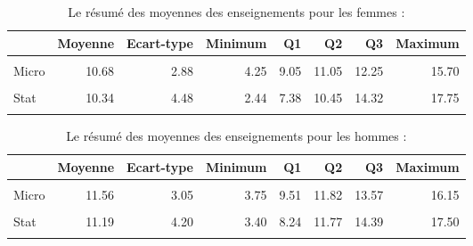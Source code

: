 \documentclass[
  11pt,
  french,
]{article}
\begin{document}
\begin{table}[!h]

\caption{\label{tab:table8 and table9}Le résumé des moyennes des enseignements pour les femmes :}
\centering
\begin{tabular}[t]{lrrrrrrr}
\toprule
  & Moyenne & Ecart-type & Minimum & Q1 & Q2 & Q3 & Maximum\\
\midrule
\cellcolor{gray!6}{Macro} & \cellcolor{gray!6}{11.57} & \cellcolor{gray!6}{3.38} & \cellcolor{gray!6}{4.25} & \cellcolor{gray!6}{9.75} & \cellcolor{gray!6}{12.10} & \cellcolor{gray!6}{13.57} & \cellcolor{gray!6}{17.13}\\
Micro & 10.68 & 2.88 & 4.25 & 9.05 & 11.05 & 12.25 & 15.70\\
\cellcolor{gray!6}{Maths} & \cellcolor{gray!6}{5.93} & \cellcolor{gray!6}{4.28} & \cellcolor{gray!6}{0.00} & \cellcolor{gray!6}{2.15} & \cellcolor{gray!6}{5.40} & \cellcolor{gray!6}{8.88} & \cellcolor{gray!6}{14.40}\\
Stat & 10.34 & 4.48 & 2.44 & 7.38 & 10.45 & 14.32 & 17.75\\
\cellcolor{gray!6}{Anglais} & \cellcolor{gray!6}{10.70} & \cellcolor{gray!6}{2.41} & \cellcolor{gray!6}{5.88} & \cellcolor{gray!6}{9.25} & \cellcolor{gray!6}{10.25} & \cellcolor{gray!6}{12.75} & \cellcolor{gray!6}{15.25}\\
\bottomrule
\end{tabular}
\end{table}

\begin{table}[!h]

\caption{\label{tab:table8 and table9}Le résumé des moyennes des enseignements pour les hommes :}
\centering
\begin{tabular}[t]{lrrrrrrr}
\toprule
  & Moyenne & Ecart-type & Minimum & Q1 & Q2 & Q3 & Maximum\\
\midrule
\cellcolor{gray!6}{Macro} & \cellcolor{gray!6}{12.05} & \cellcolor{gray!6}{3.24} & \cellcolor{gray!6}{5.80} & \cellcolor{gray!6}{9.84} & \cellcolor{gray!6}{12.09} & \cellcolor{gray!6}{14.68} & \cellcolor{gray!6}{18.60}\\
Micro & 11.56 & 3.05 & 3.75 & 9.51 & 11.82 & 13.57 & 16.15\\
\cellcolor{gray!6}{Maths} & \cellcolor{gray!6}{6.40} & \cellcolor{gray!6}{4.20} & \cellcolor{gray!6}{0.00} & \cellcolor{gray!6}{3.30} & \cellcolor{gray!6}{5.66} & \cellcolor{gray!6}{9.59} & \cellcolor{gray!6}{17.40}\\
Stat & 11.19 & 4.20 & 3.40 & 8.24 & 11.77 & 14.39 & 17.50\\
\cellcolor{gray!6}{Anglais} & \cellcolor{gray!6}{10.26} & \cellcolor{gray!6}{2.97} & \cellcolor{gray!6}{3.38} & \cellcolor{gray!6}{9.25} & \cellcolor{gray!6}{10.43} & \cellcolor{gray!6}{12.00} & \cellcolor{gray!6}{15.95}\\
\bottomrule
\end{tabular}
\end{table}
\end{document}
